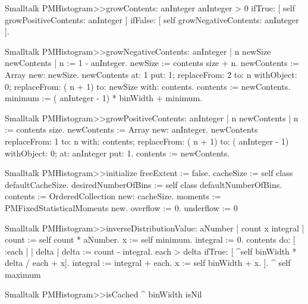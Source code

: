 \begin{displaycode}{Smalltalk}
PMHistogram>>growContents: anInteger
    anInteger > 0
        ifTrue: [ self growPositiveContents: anInteger ]
        ifFalse: [ self growNegativeContents: anInteger ].
\end{displaycode}
      
\begin{displaycode}{Smalltalk}
PMHistogram>>growNegativeContents: anInteger
    | n newSize newContents |
    n := 1 - anInteger.
    newSize := contents size + n.
    newContents := Array new: newSize.
    newContents
            at: 1 put: 1;
            replaceFrom: 2 to: n withObject: 0;
            replaceFrom: ( n + 1) to: newSize with: contents.
    contents := newContents.
    minimum := ( anInteger - 1) * binWidth + minimum.
\end{displaycode}

\begin{displaycode}{Smalltalk}
PMHistogram>>growPositiveContents: anInteger
    | n newContents |
    n := contents size.
    newContents := Array new: anInteger.
    newContents
            replaceFrom: 1 to: n with: contents;
            replaceFrom: ( n + 1) to: ( anInteger - 1) withObject: 0;
            at: anInteger put: 1.
    contents := newContents.
\end{displaycode}
  
\begin{displaycode}{Smalltalk}
PMHistogram>>initialize
    freeExtent := false.
    cacheSize := self class defaultCacheSize.
    desiredNumberOfBins := self class defaultNumberOfBins.
    contents := OrderedCollection new: cacheSize.
    moments := PMFixedStatisticalMoments new.
    overflow := 0.
    underflow := 0
\end{displaycode}
  
\begin{displaycode}{Smalltalk}
PMHistogram>>inverseDistributionValue: aNumber
    | count x integral |
    count := self count * aNumber.
    x := self minimum.
    integral := 0.
    contents do:
        [ :each | | delta |
          delta := count - integral.
          each > delta
            ifTrue: [ ^self binWidth * delta / each + x].
          integral := integral + each.
          x := self binWidth + x.
        ].
    ^ self maximum
\end{displaycode}
  
\begin{displaycode}{Smalltalk}
PMHistogram>>isCached
    ^ binWidth isNil
\end{displaycode}
    
